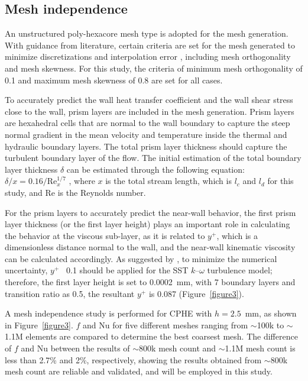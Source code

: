 \documentclass[energies,article,submit,moreauthors,noheaderline]{Definitions/mdpi}
\begin{document}
\subsection{Mesh independence}
\label{sec:mesh}

An unstructured poly-hexacore mesh type is adopted for the mesh generation. With guidance from literature, certain criteria are set for the mesh generated to minimize discretizations and interpolation error \citep{sorgente2023, juretic2010}, including mesh orthogonality and mesh skewness. For this study, the criteria of minimum mesh orthogonality of 0.1 and maximum mesh skewness of 0.8 are set for all cases.

To accurately predict the wall heat transfer coefficient and the wall shear stress close to the wall, prism layers are included in the mesh generation. Prism layers are hexahedral cells that are normal to the wall boundary to capture the steep normal gradient in the mean velocity and temperature inside the thermal and hydraulic boundary layers. The total prism layer thickness should capture the turbulent boundary layer of the flow. The initial estimation of the total boundary layer thickness $\delta$ can be estimated through the following equation: $\delta/x = 0.16/\text{Re}_x^{1/7}$ \citep{cengel2014}, where $x$ is the total stream length, which is $l_c$ and $l_d$ for this study, and Re is the Reynolds number.

For the prism layers to accurately predict the near-wall behavior, the first prism layer thickness (or the first layer height) plays an important role in calculating the behavior at the viscous sub-layer, as it is related to $y^+$, which is a dimensionless distance normal to the wall, and the near-wall kinematic viscosity can be calculated accordingly. As suggested by \citet{eca2018}, to minimize the numerical uncertainty, $y^+$ ~0.1 should be applied for the SST $k$--$\omega$ turbulence model; therefore, the first layer height is set to 0.0002~mm, with 7 boundary layers and transition ratio as 0.5, the resultant $y^+$ is 0.087 (Figure~\ref{figure3}).

A mesh independence study is performed for CPHE with $h = 2.5$~mm, as shown in Figure~\ref{figure3}. $f$ and Nu for five different meshes ranging from $\sim$100k to $\sim$1.1M elements are compared to determine the best coarsest mesh. The difference of $f$ and Nu between the results of $\sim$800k mesh count and $\sim$1.1M mesh count is less than 2.7\% and 2\%, respectively, showing the results obtained from $\sim$800k mesh count are reliable and validated, and will be employed in this study.
\end{document}
